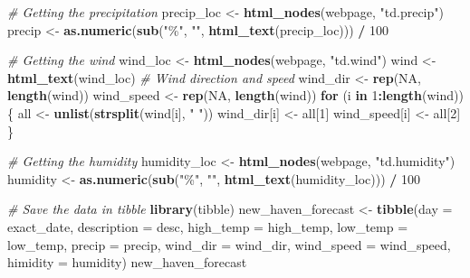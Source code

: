 \documentclass[
]{book}
\newenvironment{Shaded}{\begin{snugshade}}{\end{snugshade}}
\newcommand{\CommentTok}[1]{\textcolor[rgb]{0.56,0.35,0.01}{\textit{#1}}}
\newcommand{\ControlFlowTok}[1]{\textcolor[rgb]{0.13,0.29,0.53}{\textbf{#1}}}
\newcommand{\DecValTok}[1]{\textcolor[rgb]{0.00,0.00,0.81}{#1}}
\newcommand{\KeywordTok}[1]{\textcolor[rgb]{0.13,0.29,0.53}{\textbf{#1}}}
\newcommand{\NormalTok}[1]{#1}
\newcommand{\OperatorTok}[1]{\textcolor[rgb]{0.81,0.36,0.00}{\textbf{#1}}}
\newcommand{\OtherTok}[1]{\textcolor[rgb]{0.56,0.35,0.01}{#1}}
\newcommand{\StringTok}[1]{\textcolor[rgb]{0.31,0.60,0.02}{#1}}
\begin{document}
\begin{Shaded}
\begin{Highlighting}[]
\CommentTok{\# Getting the precipitation}
\NormalTok{precip\_loc \textless{}{-}}\StringTok{ }\KeywordTok{html\_nodes}\NormalTok{(webpage, }\StringTok{"td.precip"}\NormalTok{)}
\NormalTok{precip \textless{}{-}}\StringTok{ }\KeywordTok{as.numeric}\NormalTok{(}\KeywordTok{sub}\NormalTok{(}\StringTok{"\%"}\NormalTok{, }\StringTok{""}\NormalTok{, }\KeywordTok{html\_text}\NormalTok{(precip\_loc))) }\OperatorTok{/}\StringTok{ }\DecValTok{100}

\CommentTok{\# Getting the wind}
\NormalTok{wind\_loc \textless{}{-}}\StringTok{ }\KeywordTok{html\_nodes}\NormalTok{(webpage, }\StringTok{"td.wind"}\NormalTok{)}
\NormalTok{wind \textless{}{-}}\StringTok{ }\KeywordTok{html\_text}\NormalTok{(wind\_loc)}
\CommentTok{\# Wind direction and speed}
\NormalTok{wind\_dir \textless{}{-}}\StringTok{ }\KeywordTok{rep}\NormalTok{(}\OtherTok{NA}\NormalTok{, }\KeywordTok{length}\NormalTok{(wind))}
\NormalTok{wind\_speed \textless{}{-}}\StringTok{ }\KeywordTok{rep}\NormalTok{(}\OtherTok{NA}\NormalTok{, }\KeywordTok{length}\NormalTok{(wind))}
\ControlFlowTok{for}\NormalTok{ (i }\ControlFlowTok{in} \DecValTok{1}\OperatorTok{:}\KeywordTok{length}\NormalTok{(wind))\{}
\NormalTok{all \textless{}{-}}\StringTok{ }\KeywordTok{unlist}\NormalTok{(}\KeywordTok{strsplit}\NormalTok{(wind[i], }\StringTok{" "}\NormalTok{))}
\NormalTok{wind\_dir[i] \textless{}{-}}\StringTok{ }\NormalTok{all[}\DecValTok{1}\NormalTok{]}
\NormalTok{wind\_speed[i] \textless{}{-}}\StringTok{ }\NormalTok{all[}\DecValTok{2}\NormalTok{]}
\NormalTok{\}}

\CommentTok{\# Getting the humidity}
\NormalTok{humidity\_loc \textless{}{-}}\StringTok{ }\KeywordTok{html\_nodes}\NormalTok{(webpage, }\StringTok{"td.humidity"}\NormalTok{)}
\NormalTok{humidity \textless{}{-}}\StringTok{ }\KeywordTok{as.numeric}\NormalTok{(}\KeywordTok{sub}\NormalTok{(}\StringTok{"\%"}\NormalTok{, }\StringTok{""}\NormalTok{, }\KeywordTok{html\_text}\NormalTok{(humidity\_loc))) }\OperatorTok{/}\StringTok{ }\DecValTok{100}

\CommentTok{\# Save the data in tibble}
\KeywordTok{library}\NormalTok{(tibble)}
\NormalTok{new\_haven\_forecast \textless{}{-}}\StringTok{ }\KeywordTok{tibble}\NormalTok{(}\StringTok{\textquotesingle{}day\textquotesingle{}}\NormalTok{ =}\StringTok{ }\NormalTok{exact\_date, }\StringTok{\textquotesingle{}description\textquotesingle{}}\NormalTok{ =}\StringTok{ }\NormalTok{desc,}
                        \StringTok{\textquotesingle{}high\_temp\textquotesingle{}}\NormalTok{ =}\StringTok{ }\NormalTok{high\_temp, }\StringTok{\textquotesingle{}low\_temp\textquotesingle{}}\NormalTok{ =}\StringTok{ }\NormalTok{low\_temp,}
                        \StringTok{\textquotesingle{}precip\textquotesingle{}}\NormalTok{ =}\StringTok{ }\NormalTok{precip, }\StringTok{\textquotesingle{}wind\_dir\textquotesingle{}}\NormalTok{ =}\StringTok{ }\NormalTok{wind\_dir,}
                        \StringTok{\textquotesingle{}wind\_speed\textquotesingle{}}\NormalTok{ =}\StringTok{ }\NormalTok{wind\_speed, }\StringTok{\textquotesingle{}himidity\textquotesingle{}}\NormalTok{ =}\StringTok{ }\NormalTok{humidity)}
\NormalTok{new\_haven\_forecast}
\end{Highlighting}
\end{Shaded}
\end{document}
